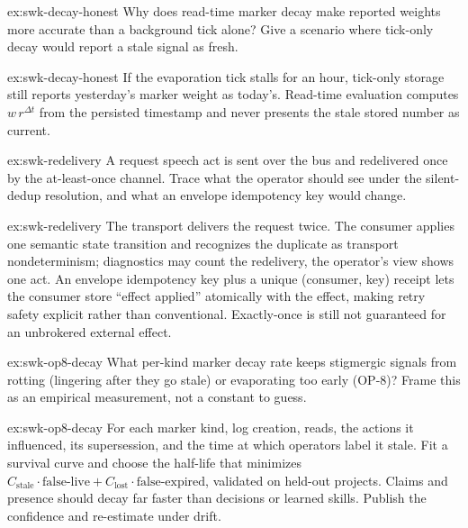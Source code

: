 \documentclass[11pt,a4paper]{article}
\theoremstyle{definition}
\theoremstyle{remark}
\begin{document}

\begin{pdexercise}[kind=Check,rating=1]{ex:swk-decay-honest}
Why does read-time marker decay make reported weights more accurate than a background tick alone? Give a scenario where tick-only decay would report a stale signal as fresh.
\end{pdexercise}
\begin{pdsolution}{ex:swk-decay-honest}
If the evaporation tick stalls for an hour, tick-only storage still reports yesterday's marker weight as today's. Read-time evaluation computes $w\,r^{\Delta t}$ from the persisted timestamp and never presents the stale stored number as current.
\end{pdsolution}
\begin{pdexercise}[kind=Trace,rating=2]{ex:swk-redelivery}
A request speech act is sent over the bus and redelivered once by the at-least-once channel. Trace what the operator should see under the silent-dedup resolution, and what an envelope idempotency key would change.
\end{pdexercise}
\begin{pdsolution}{ex:swk-redelivery}
The transport delivers the request twice. The consumer applies one semantic state transition and recognizes the duplicate as transport nondeterminism; diagnostics may count the redelivery, the operator's view shows one act. An envelope idempotency key plus a unique (consumer, key) receipt lets the consumer store ``effect applied'' atomically with the effect, making retry safety explicit rather than conventional. Exactly-once is still not guaranteed for an unbrokered external effect.
\end{pdsolution}
\begin{pdexercise}[kind=Open,rating=3]{ex:swk-op8-decay}
What per-kind marker decay rate keeps stigmergic signals from rotting (lingering after they go stale) or evaporating too early (OP-8)? Frame this as an empirical measurement, not a constant to guess.
\end{pdexercise}
\begin{pdsolution}{ex:swk-op8-decay}
For each marker kind, log creation, reads, the actions it influenced, its supersession, and the time at which operators label it stale. Fit a survival curve and choose the half-life that minimizes $C_{\text{stale}}\cdot\text{false-live} + C_{\text{lost}}\cdot\text{false-expired}$, validated on held-out projects. Claims and presence should decay far faster than decisions or learned skills. Publish the confidence and re-estimate under drift.
\end{pdsolution}
\end{document}
